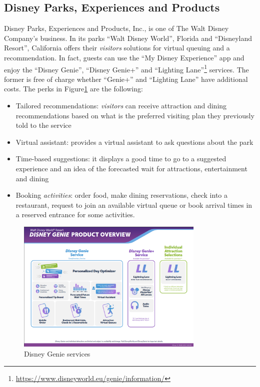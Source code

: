 \subsection{Disney Parks, Experiences and Products}\label{subsec:disney-parks-experiences-and-products}
Disney Parks, Experiences and Products, Inc., is one of The Walt Disney Company's business.
In its parks ``Walt Disney World'', Florida and ``Disneyland Resort'', California offers their \textit{visitors} solutions
for virtual queuing and a recommendation.
In fact, guests can use the ``My Disney Experience'' app and enjoy the ``Disney Genie'', ``Disney Genie+'' and ``Lighting Lane''\footnote{\url{https://www.disneyworld.eu/genie/information/}} services.
The former is free of charge whether ``Genie+'' and ``Lighting Lane'' have additional costs.
The perks in Figure\ref{fig:dgenie} are the following:

\begin{itemize}
    \item Tailored recommendations: \textit{visitors} can receive attraction and dining recommendations based on what is the preferred visiting plan they previously told
    to the service
    \item Virtual assistant: provides a virtual assistant to ask questions about the park
    \item Time-based suggestions: it displays a good time to go to a suggested experience and an idea of the forecasted wait for attractions, entertainment and dining
    \item Booking \textit{activities}: order food, make dining reservations, check into a restaurant, request to join an available virtual queue or book arrival times in a reserved entrance for
    some activities.
\end{itemize}

\begin{figure}[H]
    \centering
    \includegraphics[width=0.8\textwidth]{img/dgenie}
    \caption{Disney Genie services}
    \label{fig:dgenie}
\end{figure}

